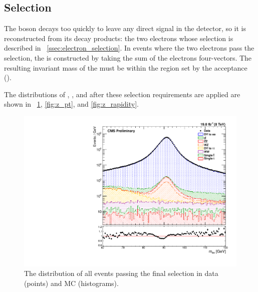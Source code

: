 \subsection{\Z Selection}

The \Z boson decays too quickly to leave any direct signal in the detector, so
it is reconstructed from its decay products: the two electrons whose selection
is described in \SEC~\ref{ssec:electron_selection}. In events where the two
electrons pass the selection, the \Z is constructed by taking the sum of the
electrons four-vectors. The resulting invariant mass of the \Z must be within
the region set by the acceptance (\MassRange).

The distributions of \mee, \Z \pt, and \Z \rapidity after these selection
requirements are applied are shown in \FIGS~\ref{fig:z_mass}, \ref{fig:z_pt},
and \ref{fig:z_rapidity}.

\begin{figure}[!htbp]
    \centering
    \includegraphics[width=\textwidth]{figures/z_mass_fine.pdf}
    \caption[
        The \mee distribution of events in data and MC.
    ]{
        The \mee distribution of all events passing the final selection in data
        (points) and MC (histograms).
    }
    \label{fig:z_mass}
\end{figure}


